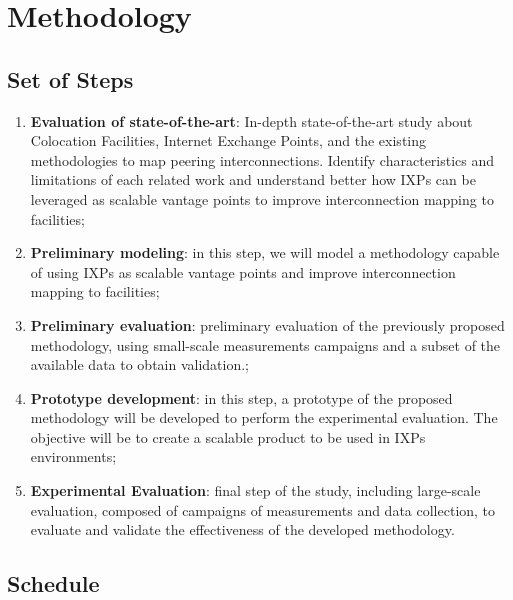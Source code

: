 \chapter{Methodology}\label{cap:methodology}
\thispagestyle{empty}

\section{Set of Steps}
\label{sec:steps}

\begin{enumerate}
\item {\bf Evaluation of state-of-the-art}: In-depth state-of-the-art study about Colocation Facilities, Internet Exchange Points, and the existing methodologies to map peering interconnections. Identify characteristics and limitations of each related work and understand better how IXPs can be leveraged as scalable vantage points to improve interconnection mapping to facilities;

\item {\bf Preliminary modeling}: in this step, we will model a methodology capable of using IXPs as scalable vantage points and improve interconnection mapping to facilities;

\item {\bf Preliminary evaluation}: preliminary evaluation of the previously proposed methodology, using small-scale measurements campaigns and a subset of the available data to obtain validation.;

\item {\bf Prototype development}: in this step, a prototype of the proposed methodology will be developed to perform the experimental evaluation. The objective will be to create a scalable product to be used in IXPs environments;

\item {\bf Experimental Evaluation}: final step of the study, including large-scale evaluation, composed of campaigns of measurements and data collection, to evaluate and validate the effectiveness of the developed methodology.

\end{enumerate}

\section{Schedule}
\label{sec:schedule}

